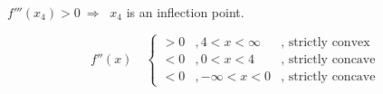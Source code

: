 \begin{example}
\begin{enumerate}
      $f'''(x_4)>0 \ \Rightarrow \ $ $x_4$ is an inflection point.


        \[ f''(x) \quad \left\{
 	\begin{array}{lll}
	  >0 &, 4 <x <\infty 	 	& \text{, strictly convex} \\
	  <0 &, 0<x<4         & \text{, strictly concave} \\
	  <0 &, -\infty<x<0             & \text{, strictly concave} 
 	\end{array}
         \right.
         \]
\end{enumerate}
\end{example}

